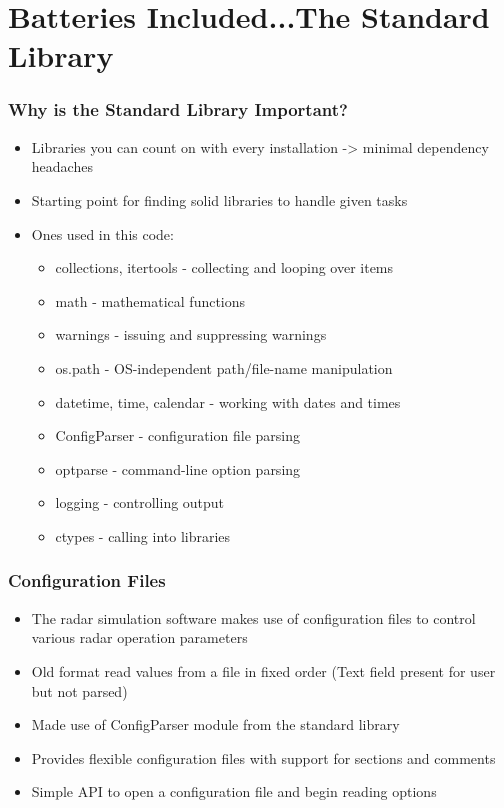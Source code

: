 \documentclass[red, hyperref={pdfpagelabels=false}]{beamer}
\begin{document}
\section[The Standard Library]{Batteries Included...The Standard Library}
\begin{frame}
  \frametitle{Why is the Standard Library Important?}
  \begin{itemize}
    \item<1-> Libraries you can count on with every installation -> minimal dependency headaches
    \item<2-> Starting point for finding solid libraries to handle given tasks
    \item<3-> Ones used in this code:
      \begin{itemize}
        \item collections, itertools - collecting and looping over items
        \item math - mathematical functions
        \item warnings - issuing and suppressing warnings
        \item os.path - OS-independent path/file-name manipulation
        \item datetime, time, calendar - working with dates and times
        \item \alert<4->{ConfigParser} - configuration file parsing
        \item \alert<4->{optparse} - command-line option parsing
        \item \alert<4->{logging} - controlling output
        \item \alert<4->{ctypes} - calling into libraries
      \end{itemize}
  \end{itemize}
\end{frame}

\begin{frame}
  \frametitle{Configuration Files}
  \begin{itemize}
    \item The radar simulation software makes use of configuration files to
      control various radar operation parameters
    \item Old format read values from a file in fixed order (Text field present for user but not parsed)
    \item Made use of ConfigParser module from the standard library
    \item Provides flexible configuration files with support for sections and comments
    \item Simple API to open a configuration file and begin reading options
  \end{itemize}
\end{frame}
\end{document}
